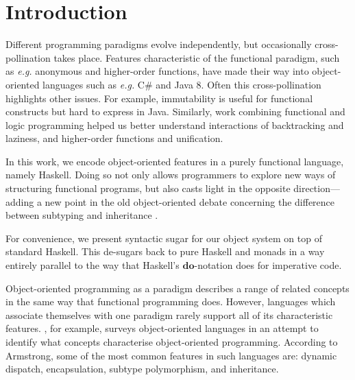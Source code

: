 \section{Introduction}
\label{sec:introduction}

Different programming paradigms evolve independently, but occasionally cross-pollination takes place. Features characteristic of the functional paradigm, such as \emph{e.g.} anonymous and higher-order functions, have made their way into object-oriented languages such as \emph{e.g.} C\# and Java 8. Often this cross-pollination highlights other issues. For example, immutability is useful for functional constructs but hard to express in Java. Similarly, work combining functional and logic programming \citep{nadathur1988overview,hanus2006curry,somogyi1996execution} helped us better understand interactions of backtracking and laziness, and higher-order functions and unification.

In this work, we encode object-oriented features in a purely functional language, namely Haskell. Doing so not only allows programmers to explore new ways of structuring functional programs, but also casts light in the opposite direction---adding a new point in the old object-oriented debate concerning the difference between subtyping and inheritance \cite{cook1989inheritance}. 

For convenience, we present syntactic sugar for our object system on top of standard Haskell. This de-sugars back to pure Haskell and monads in a way entirely
parallel to the way that Haskell's $\mathbf{do}$-notation does for imperative code.

Object-oriented programming as a paradigm describes a range of related concepts in the same way that functional programming does. However, languages which associate themselves with one paradigm rarely support all of its characteristic features. \citet{armstrong2006quarks}, for example, surveys object-oriented languages in an attempt to identify what concepts characterise object-oriented programming. According to Armstrong, some of the most common features in such languages are: dynamic dispatch, encapsulation, subtype polymorphism, and inheritance. 

